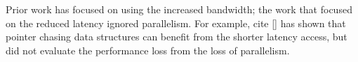Prior work has focused on using the increased bandwidth; the work that focused on the reduced latency ignored parallelism. For example, cite [] has shown that pointer chasing data structures can benefit from the shorter latency access, but did not evaluate the performance loss from the loss of parallelism. 




\begin{comment}
Hardware architects have proposed 
near-memory computing (also called processing-in-memory, or PIM), 
where a lightweight processor (called a PIM core) is located close to 
memory. 
Due to its proximity, a memory access from this core is much faster than from a CPU core.
New advances in 3D 
integration and in die stacked memory make PIM viable in the 
near future. Prior work has shown significant performance improvements from using PIM for 
embarrassingly parallel and data-intensive applications, as well as 
pointer-chasing traversals in \emph{sequential} data structures. 

In this paper, we show that
  naive PIM data structures cannot outperform 
 state-of-the-art \emph{concurrent} data structures. In particular, 
the lower latency access to memory cannot compensate for the loss of 
parallelism. Server machines nowadays have hundreds of cores; algorithms for 
concurrent data structures exploit these cores to achieve high throughput and 
scalability. 
Therefore, to be competitive with traditional concurrent data 
structures, PIM data structures need new approaches to leverage parallelism. We 
investigate designing PIM algorithms that can outperform concurrent data structures for
two classes of data structures: pointer chasing data 
structures, which have a high degree of inherent parallelism and low contention, but incur significant 
overhead due to unpredictable memory accesses; and 
FIFO queues, which can exploit high locality leveraging CPU caches, but have a high degree of contention. 
We propose new designs for PIM 
data structures using 
techniques such as combining, partitioning and pipelining, that can outperform traditional 
concurrent data structures, with a significantly simpler design.  


===================

Hardware architects have proposed 
near-memory computing (also called processing-in-memory, or PIM), 
where a lightweight processor (called a PIM core) is located close to 
memory. 
Due to its proximity, a memory access from this core is much faster than from a CPU core.
New advances in 3D 
integration and in die stacked memory make PIM viable in the 
near future. Prior work has shown significant performance improvements from using PIM for 
embarrassingly parallel and data-intensive applications, as well as 
pointer-chasing traversals in \emph{sequential} data structures. 


\end{comment}
